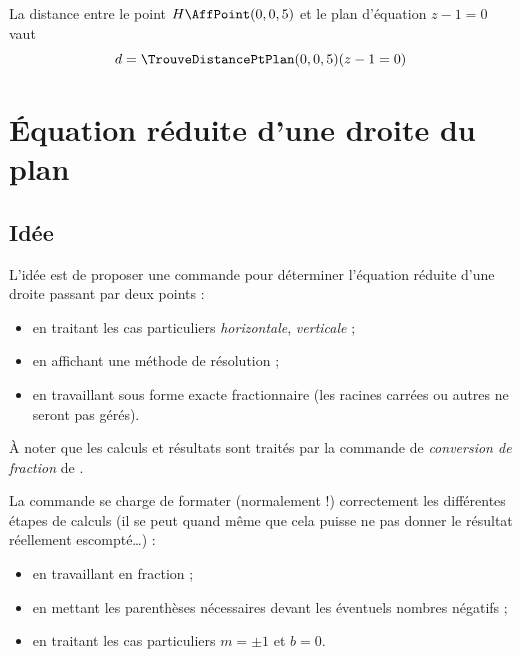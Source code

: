 \documentclass[a4paper,french,11pt]{article}
\newcommand\ctex[1]{\tcbox[vignettelatex]{#1}}
\newcommand\cmaj[1]{%
	{\tcbox[vignetteMaJ]{#1}\xspace}%
}
\begin{document}
\begin{PresCodePL}{}
La distance entre le point $H\AffPoint(0,0,5)$ et le plan d'équation $z-1=0$ vaut
\[ d = \displaystyle\TrouveDistancePtPlan(0,0,5)(z-1=0) \]
\end{PresCodePL}

\newpage

\section{Équation réduite d'une droite du plan}\label{eqreduite}

\subsection{Idée}

\begin{tipblock}
\cmaj{2.6.3} L'idée est de proposer une commande pour déterminer l'équation réduite d'une droite passant par deux points :
\begin{itemize}
	\item en traitant les cas particuliers \textit{horizontale}, \textit{verticale} ;
	\item en affichant une méthode de résolution ;
	\item en travaillant sous forme exacte fractionnaire (les racines carrées ou autres ne seront pas gérés).
\end{itemize}

À noter que les calculs et résultats sont traités par la commande de \textit{conversion de fraction} de \ctex{ProfLycee}.
\end{tipblock}

\begin{warningblock}
La commande se charge de formater (normalement !) correctement les différentes étapes de calculs (il se peut quand même que cela puisse ne pas donner le résultat réellement escompté\ldots) :

\begin{itemize}
	\item en travaillant en fraction ;
	\item en mettant les parenthèses nécessaires devant les éventuels nombres négatifs ;
	\item en traitant les cas particuliers $m=\pm1$ et $b=0$.
\end{itemize}
\vspace*{-\baselineskip}\leavevmode
\end{warningblock}
\end{document}
